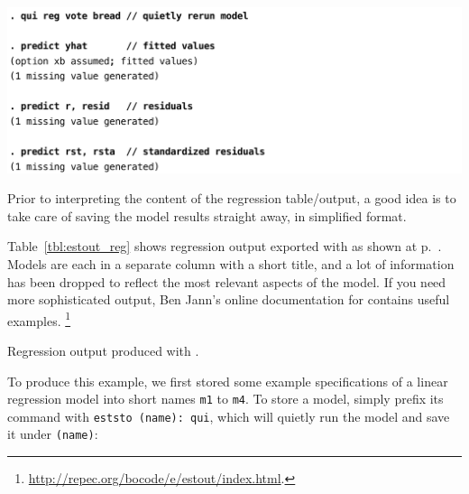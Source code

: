 \begin{table}[htp]
	\includegraphics[scale=.5]{images/hibbs_yx1_predict.pdf}

	\caption[Storing estimates with ]{\label{tbl:hibbs_yx1_predict}%
	Storing estimates with . %
	\hibbs}
\end{table}%

Prior to interpreting the content of the regression table/output, a good idea is to take care of saving the model results straight away, in simplified format.

Table~\ref{tbl:estout_reg} shows regression output exported with  as shown at p.~\pageref{tbl:hibbs_yx1_estout}. Models are each in a separate column with a short title, and a lot of information has been dropped to reflect the most relevant aspects of the model. If you need more sophisticated output, Ben Jann's online documentation for  contains useful examples.%
\footnote{\url{http://repec.org/bocode/e/estout/index.html}.}


\begin{fullwidth}
	\begin{table}
		\footnotesize
    
		\caption{Regression output produced with .}
		\label{tbl:estout_reg}
	\end{table}
\end{fullwidth}

To produce this example, we first stored some example specifications of a linear regression model into short names \texttt{m1} to \texttt{m4}. To store a model, simply prefix its command with \texttt{eststo (name): qui}, which will quietly run the model and save it under \texttt{(name)}:

